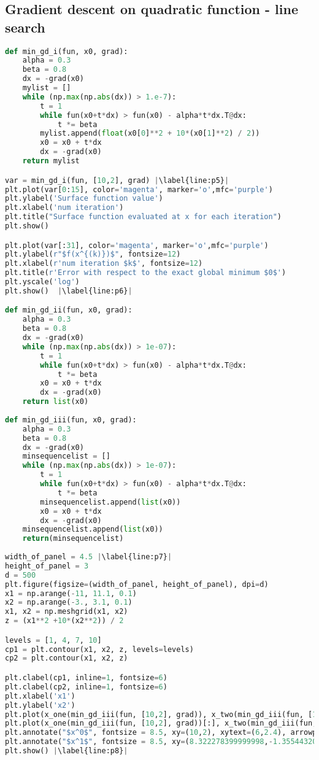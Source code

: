 \subsection{Gradient descent on quadratic function - line search}\label{GD-on-qd}
\begin{lstlisting}[language=Python, label={lst:code3}, mathescape=true, breaklines=true, escapechar=|]
def min_gd_i(fun, x0, grad): 
    alpha = 0.3
    beta = 0.8
    dx = -grad(x0)
    mylist = []
    while (np.max(np.abs(dx)) > 1.e-7):
        t = 1
        while fun(x0+t*dx) > fun(x0) - alpha*t*dx.T@dx:
            t *= beta
        mylist.append(float(x0[0]**2 + 10*(x0[1]**2) / 2))
        x0 = x0 + t*dx
        dx = -grad(x0)      
    return mylist

var = min_gd_i(fun, [10,2], grad) |\label{line:p5}|
plt.plot(var[0:15], color='magenta', marker='o',mfc='purple')
plt.ylabel('Surface function value') 
plt.xlabel('num iteration') 
plt.title("Surface function evaluated at x for each iteration") 
plt.show() 

plt.plot(var[:31], color='magenta', marker='o',mfc='purple')
plt.ylabel(r"$f(x^{(k)})$", fontsize=12) 
plt.xlabel(r'num iteration $k$', fontsize=12) 
plt.title(r'Error with respect to the exact global minimum $0$')
plt.yscale('log')
plt.show()  |\label{line:p6}|

def min_gd_ii(fun, x0, grad):
    alpha = 0.3
    beta = 0.8
    dx = -grad(x0)
    while (np.max(np.abs(dx)) > 1e-07):
        t = 1
        while fun(x0+t*dx) > fun(x0) - alpha*t*dx.T@dx:
            t *= beta
        x0 = x0 + t*dx
        dx = -grad(x0)   
    return list(x0)
    
def min_gd_iii(fun, x0, grad):
    alpha = 0.3
    beta = 0.8
    dx = -grad(x0)
    minsequencelist = []
    while (np.max(np.abs(dx)) > 1e-07):
        t = 1
        while fun(x0+t*dx) > fun(x0) - alpha*t*dx.T@dx:
            t *= beta
        minsequencelist.append(list(x0))
        x0 = x0 + t*dx
        dx = -grad(x0)  
    minsequencelist.append(list(x0))
    return(minsequencelist)
    
width_of_panel = 4.5 |\label{line:p7}|
height_of_panel = 3
d = 500
plt.figure(figsize=(width_of_panel, height_of_panel), dpi=d)
x1 = np.arange(-11, 11.1, 0.1)
x2 = np.arange(-3., 3.1, 0.1)
x1, x2 = np.meshgrid(x1, x2)
z = (x1**2 +10*(x2**2)) / 2

levels = [1, 4, 7, 10]
cp1 = plt.contour(x1, x2, z, levels=levels)
cp2 = plt.contour(x1, x2, z)

plt.clabel(cp1, inline=1, fontsize=6)
plt.clabel(cp2, inline=1, fontsize=6)
plt.xlabel('x1')
plt.ylabel('x2')
plt.plot(x_one(min_gd_iii(fun, [10,2], grad)), x_two(min_gd_iii(fun, [10,2], grad)), color='lightseagreen')
plt.plot(x_one(min_gd_iii(fun, [10,2], grad))[:], x_two(min_gd_iii(fun, [10,2], grad))[:], "or", markerfacecolor="None", markeredgecolor='black', markeredgewidth=1.1, markersize=2.6)
plt.annotate("$x^0$", fontsize = 8.5, xy=(10,2), xytext=(6,2.4), arrowprops=dict(arrowstyle = '-|>', connectionstyle = 'Arc3',facecolor='r'))
plt.annotate("$x^1$", fontsize = 8.5, xy=(8.322278399999998,-1.3554432000000016), xytext=(6,-2), arrowprops=dict(arrowstyle = '-|>', connectionstyle = 'Arc3',facecolor='r'))
plt.show() |\label{line:p8}|
\end{lstlisting}
